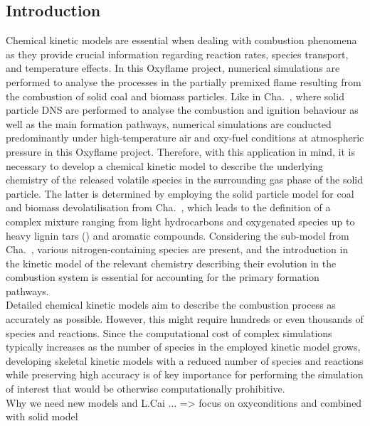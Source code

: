 \begin{refsection}
\section{Introduction} 
Chemical kinetic models are essential when dealing with combustion phenomena as they provide crucial information regarding reaction rates, species transport, and temperature effects. In this Oxyflame project, numerical simulations are performed to analyse the processes in the partially premixed flame resulting from the combustion of solid coal and biomass particles. Like in Cha.~, where solid particle DNS are performed to analyse the combustion and ignition behaviour as well as the main  formation pathways, numerical simulations are conducted predominantly under high-temperature air and oxy-fuel conditions at atmospheric pressure in this Oxyflame project. Therefore, with this application in mind, it is necessary to develop a chemical kinetic model to describe the underlying chemistry of the released volatile species in the surrounding gas phase of the solid particle. The latter is determined by employing the solid particle model for coal and biomass devolatilisation from Cha.~, which leads to the definition of a complex mixture ranging from light hydrocarbons and oxygenated species up to heavy lignin tars () and aromatic compounds. Considering the  sub-model from Cha.~, various nitrogen-containing species are present, and the introduction in the kinetic model of the relevant chemistry describing their evolution in the combustion system is essential for accounting for the primary  formation pathways.
\\
Detailed chemical kinetic models aim to describe the combustion process as accurately as possible. However, this might require hundreds or even thousands of species and reactions. Since the computational cost of complex simulations typically increases as the number of species in the employed kinetic model grows, developing skeletal kinetic models with a reduced number of species and reactions while preserving high accuracy is of key importance for performing the simulation of interest that would be otherwise computationally prohibitive.
\\
Why we need new models and L.Cai ... => focus on oxyconditions and combined with solid model
 




\end{refsection}

